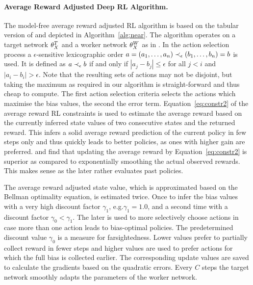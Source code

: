 \documentclass[envcountsame]{llncs}
\begin{document}
\paragraph{Average Reward Adjusted Deep RL Algorithm.} %
The model-free average reward adjusted RL algorithm is based on the tabular version of
\citet{schneckenreither2020average} and depicted in Algorithm~\ref{alg:near}. The algorithm operates
on a target network \(\theta_X^{T}{}\) and a worker network \(\theta_X^{W}{}\) as in
\citet{mnih2015human}. %
%
In the action selection process a \(\epsilon\)-sensitive lexicographic order
\(a=(a_{1},\ldots,a_{n}) \prec_{\epsilon} (b_{1},\ldots,b_{n})=b\) is used. It is defined as \(a \prec_{\epsilon} b\) if and
only if \(| a_{j} - b_{j} | \leqslant \epsilon\) for all \(j < i\) and
\(|a_{i} - b_{i}| > \epsilon\). Note that the resulting sets of actions may not be disjoint, but
taking the maximum as required in our algorithm is straight-forward and thus cheap to compute. The
first action selection criteria selects the actions which maximise the bias values, the second the
error term.
%
Equation~\ref{eq:constr2} of the average reward RL constraints is used to estimate the average
reward based on the currently inferred state values of two consecutive states and the returned
reward. %
This infers a solid average reward prediction of the current policy in few steps only and thus
quickly leads to better policies, as ones with higher gain are preferred.
\citet{schneckenreither2020average} and
\citet{Tadepalli98_ModelbasedAverageRewardReinforcementLearning} find that updating the average
reward by Equation~\ref{eq:constr2} is superior as compared to exponentially smoothing the actual
observed rewards. This makes sense as the later rather evaluates past policies.

The average reward adjusted state value, which is approximated based on the Bellman optimality
equation, is estimated twice. Once to infer the bias values with a very high discount factor
\(\gamma_{1}\), e.g.\@ \(\gamma_{1} = 1.0\), and a second time with a discount factor
\(\gamma_{0} < \gamma_{1}\). The later is used to more selectively choose actions in case more than
one action leads to bias-optimal policies. The predetermined discount value \(\gamma_{0}\) is a
measure for farsightedness. Lower values prefer to partially collect reward in fewer steps and
higher values are used to prefer actions for which the full bias is collected earlier.
%
The corresponding update values are saved to calculate the gradients based on the quadratic errors.
Every \(C\) steps the target network smoothly adapts the parameters of the worker network.
\end{document}

